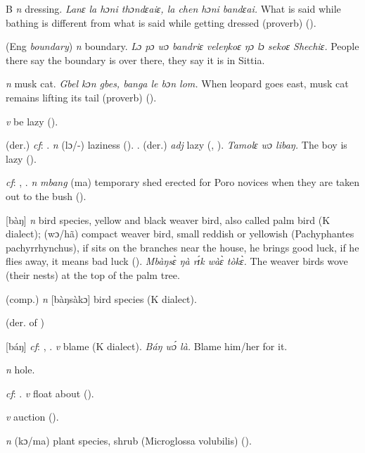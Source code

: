 \begin{letter}{B}
 \textit{n} dressing. \textit{Lanɛ la hɔni thɔndɛaiɛ, la chen hɔni bandɛai.} What is said while bathing is different from what is said while getting dressed (proverb) (\citealt{TISLL1979}). 

 (Eng \textit{boundary}) \textit{n} boundary. \textit{Lɔ pɔ wɔ bandriɛ veleŋkoɛ ŋɔ lɔ sekoɛ Shechiɛ.} People there say the boundary is over there, they say it is in Sittia. 

 \textit{n} musk cat. \textit{Gbel kɔn gbes, banga le bɔn lom.} When leopard goes east, musk cat remains lifting its tail (proverb) (\citealt{TISLL1979}). 

 \textit{v} be lazy (\citealt{Pichl1967}).

 (der.) \textit{cf}: . \textit{n} (lɔ/-) laziness (\citealt{Pichl1967}).
.
 (der.) \textit{adj} lazy (\citealt{Pichl1967}, \citealt{Sumner1921}). \textit{Tamolɛ wɔ libaŋ.} The boy is lazy (\citealt{Pichl1967}). 

 \textit{cf}: , . \textit{n} \textit{mbang} (ma) temporary shed erected for Poro novices when they are taken out to the bush (\citealt{Pichl1967}).

 [bàŋ] \textit{n} bird species, yellow and black weaver bird, also called palm bird (K dialect); (wɔ/hã) compact weaver bird, small reddish or yellowish (Pachyphantes pachyrrhynchus), if sits on the branches near the house, he brings good luck, if he flies away, it means bad luck (\citealt{Pichl1967}). \textit{Mbàŋsɛ̀ ŋà rɪ́k wàɛ̀ tòkɛ̀.} The weaver birds wove (their nests) at the top of the palm tree.

 (comp.) \textit{n} [bàŋsàkɔ] bird species (K dialect). 

 (der. of ) 

 [báŋ] \textit{cf}: , . \textit{v} blame (K dialect). \textit{Báŋ wɔ́ là.} Blame him/her for it.

 \textit{n} hole.

 \textit{cf}: . \textit{v} float about (\citealt{Pichl1967}).

 \textit{v} auction (\citealt{Pichl1967}).

 \textit{n} (kɔ/ma) plant species, shrub (Microglossa volubilis) (\citealt{Pichl1967}). 


\end{letter}
